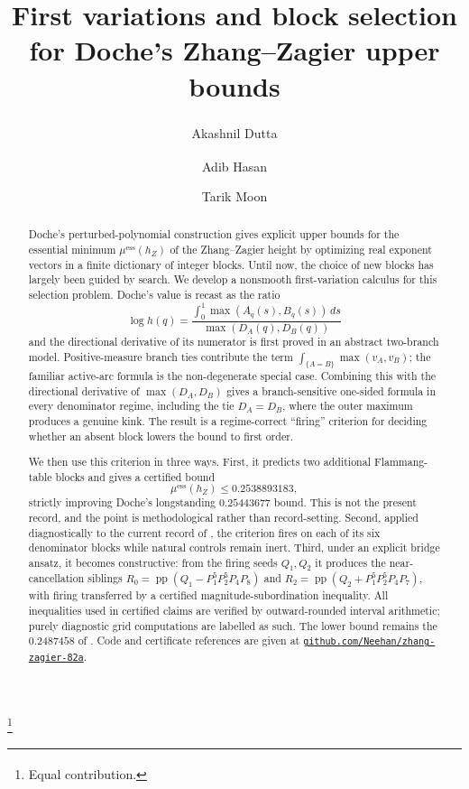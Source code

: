 \documentclass[11pt,reqno]{amsart}
\theoremstyle{plain}
\theoremstyle{definition}
\theoremstyle{remark}
\newcommand{\hZ}{h_Z}
\newcommand{\essmin}{\mu^{\mathrm{ess}}(\hZ)}
\DeclareMathOperator{\pp}{pp}
\newcommand{\repo}{\href{https://github.com/Neehan/zhang-zagier-82a}{\texttt{github.com/Neehan/zhang-zagier-82a}}}
\begin{document}
\title[First variations for Zhang--Zagier upper bounds]
{First variations and block selection for Doche's Zhang--Zagier upper bounds}

\author{Akashnil Dutta\textsuperscript{\dag}}
\address{Akashnil Dutta, Incept Labs}

\author{Adib Hasan\textsuperscript{\dag}}
\address{Adib Hasan, SignalPilot AI}

\author{Tarik Moon}
\address{Tarik Moon, SignalPilot AI}

\thanks{\textsuperscript{\dag} Equal contribution.}

\date{}


\begin{abstract}
Doche's perturbed-polynomial construction gives explicit upper bounds for the
essential minimum $\essmin$ of the Zhang--Zagier height by optimizing real exponent
vectors in a finite dictionary of integer blocks.  Until now, the choice of new blocks
has largely been guided by search.  We develop a nonsmooth first-variation calculus for
this selection problem.  Doche's value is recast as the ratio
\[
  \log h(q)=\frac{\int_0^1\max(A_q(s),B_q(s))\,ds}{\max(D_A(q),D_B(q))}
\]
and the directional derivative of its numerator is first proved in an abstract
two-branch model.  Positive-measure branch ties contribute the term
$\int_{\{A=B\}}\max(v_A,v_B)$; the familiar active-arc formula is the non-degenerate
special case.  Combining this with the directional derivative of
$\max(D_A,D_B)$ gives a branch-sensitive one-sided formula in every denominator regime,
including the tie $D_A=D_B$, where the outer maximum produces a genuine kink.  The
result is a regime-correct ``firing'' criterion for deciding whether an absent block
lowers the bound to first order.

We then use this criterion in three ways.  First, it predicts two additional
Flammang-table blocks and gives a certified bound
\[
  \essmin\le 0.2538893183,
\]
strictly improving Doche's longstanding $0.25443677$ bound.  This is not the present
record, and the point is methodological rather than record-setting.  Second, applied
diagnostically to the current record of \citet{Gri26}, the criterion fires on each of
its six denominator blocks while natural controls remain inert.  Third, under an
explicit bridge ansatz, it becomes constructive: from the
firing seeds $Q_1,Q_2$ it produces the near-cancellation siblings
$R_0=\pp(Q_1-P_1^5P_2^5P_4P_8)$ and
$R_2=\pp(Q_2+P_1^5P_2^5P_4P_7)$, with firing transferred by a certified
magnitude-subordination inequality.  All inequalities used in certified claims are
verified by outward-rounded interval arithmetic; purely diagnostic grid computations
are labelled as such.  The lower bound remains the $0.2487458$ of \citet{F18}.
Code and certificate references are given at \repo.
\end{abstract}
\end{document}
